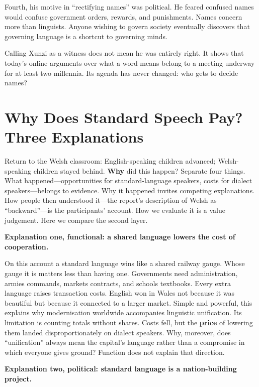 Fourth, his motive in ``rectifying names'' was political. He feared confused names would confuse government orders, rewards, and punishments. Names concern more than linguists. Anyone wishing to govern society eventually discovers that governing language is a shortcut to governing minds.

Calling Xunzi as a witness does not mean he was entirely right. It shows that today's online arguments over what a word means belong to a meeting underway for at least two millennia. Its agenda has never changed: who gets to decide names?

\section[Why Does Standard Speech Pay?]{Why Does Standard Speech Pay? Three Explanations}
Return to the Welsh classroom: English-speaking children advanced; Welsh-speaking children stayed behind. \textbf{Why} did this happen? Separate four things. What happened---opportunities for standard-language speakers, costs for dialect speakers---belongs to evidence. Why it happened invites competing explanations. How people then understood it---the report's description of Welsh as ``backward''---is the participants' account. How we evaluate it is a value judgement. Here we compare the second layer.

\textbf{Explanation one, functional: a shared language lowers the cost of cooperation.}

On this account a standard language wins like a shared railway gauge. Whose gauge it is matters less than having one. Governments need administration, armies commands, markets contracts, and schools textbooks. Every extra language raises transaction costs. English won in Wales not because it was beautiful but because it connected to a larger market. Simple and powerful, this explains why modernisation worldwide accompanies linguistic unification. Its limitation is counting totals without shares. Costs fell, but the \textbf{price} of lowering them landed disproportionately on dialect speakers. Why, moreover, does ``unification'' always mean the capital's language rather than a compromise in which everyone gives ground? Function does not explain that direction.

\textbf{Explanation two, political: standard language is a nation-building project.}

